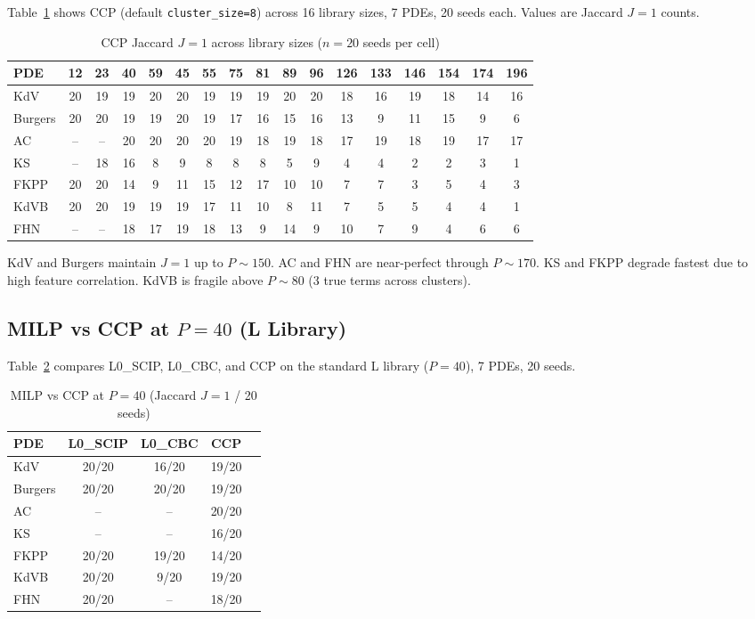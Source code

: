 \documentclass[11pt]{article}
\begin{document}
Table~\ref{tab:ccp_scaling} shows CCP (default \texttt{cluster\_size=8}) across
16 library sizes, 7 PDEs, 20 seeds each. Values are Jaccard $J=1$ counts.

\begin{table}[ht]
\centering
\caption{CCP Jaccard $J=1$ across library sizes ($n=20$ seeds per cell)}
\label{tab:ccp_scaling}
\footnotesize
\begin{tabular}{lcccccccccccccccc}
\toprule
PDE   & 12 & 23 & 40 & 59 & 45 & 55 & 75 & 81 & 89 & 96 & 126 & 133 & 146 & 154 & 174 & 196 \\
\midrule
KdV     & 20 & 19 & 19 & 20 & 20 & 19 & 19 & 19 & 20 & 20 & 18 & 16 & 19 & 18 & 14 & 16 \\
Burgers & 20 & 20 & 19 & 19 & 20 & 19 & 17 & 16 & 15 & 16 & 13 & 9  & 11 & 15 & 9  & 6  \\
AC      & -- & -- & 20 & 20 & 20 & 20 & 19 & 18 & 19 & 18 & 17 & 19 & 18 & 19 & 17 & 17 \\
KS      & -- & 18 & 16 & 8  & 9  & 8  & 8  & 8  & 5  & 9  & 4  & 4  & 2  & 2  & 3  & 1  \\
FKPP    & 20 & 20 & 14 & 9  & 11 & 15 & 12 & 17 & 10 & 10 & 7  & 7  & 3  & 5  & 4  & 3  \\
KdVB    & 20 & 20 & 19 & 19 & 19 & 17 & 11 & 10 & 8  & 11 & 7  & 5  & 5  & 4  & 4  & 1  \\
FHN     & -- & -- & 18 & 17 & 19 & 18 & 13 & 9  & 14 & 9  & 10 & 7  & 9  & 4  & 6  & 6  \\
\bottomrule
\end{tabular}
\end{table}

KdV and Burgers maintain $J=1$ up to $P\sim150$. AC and FHN are near-perfect
through $P\sim170$. KS and FKPP degrade fastest due to high feature
correlation. KdVB is fragile above $P\sim80$ (3 true terms across clusters).

\subsection{MILP vs CCP at $P=40$ (L Library)}

Table~\ref{tab:milp_vs_ccp} compares L0\_SCIP, L0\_CBC, and CCP on the
standard L library ($P=40$), 7 PDEs, 20 seeds.

\begin{table}[ht]
\centering
\caption{MILP vs CCP at $P=40$ (Jaccard $J=1$ / 20 seeds)}
\label{tab:milp_vs_ccp}
\begin{tabular}{lcccc}
\toprule
PDE   & L0\_SCIP & L0\_CBC & CCP \\
\midrule
KdV     & 20/20 & 16/20 & 19/20 \\
Burgers & 20/20 & 20/20 & 19/20 \\
AC      & --    & --    & 20/20 \\
KS      & --    & --    & 16/20 \\
FKPP    & 20/20 & 19/20 & 14/20 \\
KdVB    & 20/20 & 9/20  & 19/20 \\
FHN     & 20/20 & --    & 18/20 \\
\bottomrule
\end{tabular}
\end{table}
\end{document}
